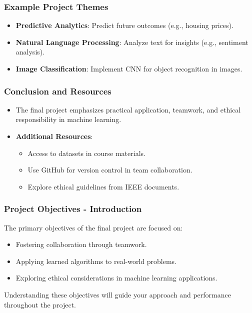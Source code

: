 \documentclass[aspectratio=169]{beamer}
\begin{document}
\begin{frame}[fragile]
    \frametitle{Example Project Themes}
    \begin{itemize}
        \item \textbf{Predictive Analytics}: Predict future outcomes (e.g., housing prices).
        \item \textbf{Natural Language Processing}: Analyze text for insights (e.g., sentiment analysis).
        \item \textbf{Image Classification}: Implement CNN for object recognition in images.
    \end{itemize}
\end{frame}

\begin{frame}[fragile]
    \frametitle{Conclusion and Resources}
    \begin{itemize}
        \item The final project emphasizes practical application, teamwork, and ethical responsibility in machine learning.
        \item \textbf{Additional Resources}:
        \begin{itemize}
            \item Access to datasets in course materials.
            \item Use GitHub for version control in team collaboration.
            \item Explore ethical guidelines from IEEE documents.
        \end{itemize}
    \end{itemize}
\end{frame}

\begin{frame}[fragile]
    \frametitle{Project Objectives - Introduction}
    The primary objectives of the final project are focused on:
    \begin{itemize}
        \item Fostering collaboration through teamwork.
        \item Applying learned algorithms to real-world problems.
        \item Exploring ethical considerations in machine learning applications.
    \end{itemize}
    Understanding these objectives will guide your approach and performance throughout the project.
\end{frame}
\end{document}
